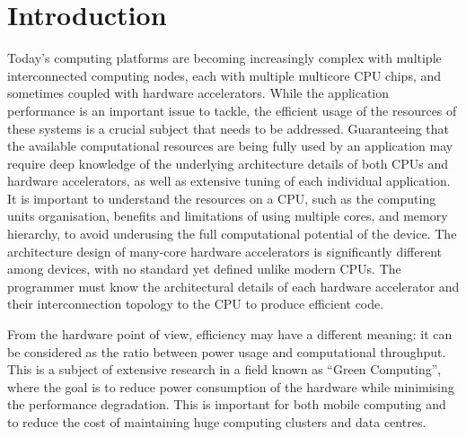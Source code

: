 
\chapter{Introduction}
\label{introduction}

Today's computing platforms are becoming increasingly complex with multiple interconnected computing nodes, each with multiple multicore CPU chips, and sometimes coupled with hardware accelerators. While the application performance is an important issue to tackle, the efficient usage of the resources of these systems is a crucial subject that needs to be addressed. Guaranteeing that the available computational resources are being fully used by an application may require deep knowledge of the underlying architecture details of both CPUs and hardware accelerators, as well as extensive tuning of each individual application. It is important to understand the resources on a CPU, such as the computing units organisation, benefits and limitations of using multiple cores, and memory hierarchy, to avoid underusing the full computational potential of the device. The architecture design of many-core hardware accelerators is significantly different among devices, with no standard yet defined unlike modern CPUs. The programmer must know the architectural details of each hardware accelerator and their interconnection topology to the CPU to produce efficient code.

From the hardware point of view, efficiency may have a different meaning: it can be considered as the ratio between power usage and computational throughput. This is a subject of extensive research in a field known as ``Green Computing'', where the goal is to reduce power consumption of the hardware while minimising the performance degradation. This is important for both mobile computing and to reduce the cost of maintaining huge computing clusters and data centres.

